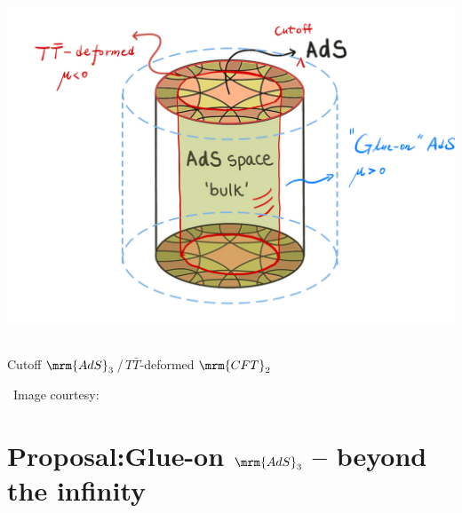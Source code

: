 \documentclass[10pt]{article}
\newcommand{\citations}[1]{{\footnotesize#1\par}}
\newcommand{\TTbar}{\texorpdfstring{\ensuremath{T\bar{T}}}{TTbar}\xspace}
\begin{document}
\begin{multicols}{3}
\vspace*{-4\baselineskip}
\begin{center}
	\mbox{
		\hspace{-3em}
		\includegraphics[width=1.19\linewidth]{img/ads-cft-cutoff.png}
	}
	
	\vspace{-.9\baselineskip}\small
	Cutoff $\mrm{AdS}_3$\,/\,\TTbar-deformed $\mrm{CFT}_2$

	\vspace{-.3\baselineskip}
	\scriptsize\ Image courtesy: \textcite{AldegundePWSep22}
\end{center}


%
%
%
%

\vspace{-1.5\baselineskip}

\section*{\textbf{Proposal:}\texstringonly{\\}Glue-on $\mrm{AdS}_3$ -- beyond the infinity}
\label{se:glueonproposal}


\end{multicols}
\end{document}
